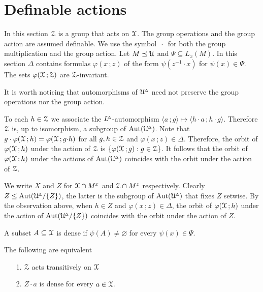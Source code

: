 \section{Definable actions}
\label{definable}

\def\ceq#1#2#3{\noindent\parbox[t]{15ex}{$\displaystyle #1$}\parbox{6ex}{\hfil $#2$}{$\displaystyle #3$}}

In this section $\EuScript Z$ is a group that acts on $\EuScript X$.
The group operations and the group action are assumed definable.
We use the symbol $\,\cdot\,$ for both the group multiplication and the group action.
Let $M\preceq\EuScript U$ and $\Psi\subseteq L_x(M)$.
In this section $\Delta$ contains formulas $\varphi(x\,;z)$ of the form $\psi(z^{-1}\!\cdot x)$ for $\psi(x)\in\Psi$.
The sets $\varphi(\EuScript X\,;\EuScript Z)$ are $\EuScript Z$-invariant.

It is worth noticing that automorphisms of $\EuScript U\kern-.2ex^{\scriptscriptstyle\Delta}$ need not preserve the group operations nor the group action.

To each $h\in\EuScript Z$ we associate the $L\kern-.4ex^{\scriptscriptstyle\Delta}$-automorphism $\langle a\,;g\rangle\mapsto\langle h{\cdot}a\,;h{\cdot}g\rangle$.
Therefore $\EuScript Z$ is, up to isomorphism, a subgroup of ${\rm Aut}(\EuScript U\kern-.2ex^{\scriptscriptstyle\Delta})$.
Note that $g\cdot\varphi(\EuScript X\,;h)=\varphi(\EuScript X\,;g{\cdot}h)$ for all $g,h\in\EuScript Z$ and $\varphi(x\,;z)\in\Delta$.
Therefore, the orbit of $\varphi(\EuScript X\,;h)$ under the action of $\EuScript Z$ is $\{\varphi(\EuScript X\,;g) : g\in\EuScript Z\}$.
It follows that the orbit of $\varphi(\EuScript X\,;h)$ under the actions of ${\rm Aut}(\EuScript U\kern-.2ex^{\scriptscriptstyle\Delta})$ coincides with the orbit under the action of $\EuScript Z$.

We write $X$ and $Z$ for $\EuScript X\cap M^x$ and $\EuScript Z\cap M^z$ respectively.
Clearly $Z\le{\rm Aut}(\EuScript U\kern-.2ex^{\scriptscriptstyle\Delta}/\{Z\})$, the latter is the subgroup of ${\rm Aut}(\EuScript U\kern-.2ex^{\scriptscriptstyle\Delta})$ that fixes $Z$ setwise.
By the observation above, when $h\in Z$ and $\varphi(x\,;z)\in\Delta$, the orbit of $\varphi(\EuScript X\,;h)$ under the action of ${\rm Aut}(\EuScript U\kern-.2ex^{\scriptscriptstyle\Delta}/\{Z\})$ coincides with the orbit under the action of $Z$.

A subset $A\subseteq\EuScript X$ is dense if $\psi(A)\neq\varnothing$ for every $\psi(x)\in\Psi$.

\begin{fact}
  The following are equivalent
  \begin{itemize}
    \item [1.] $\EuScript Z$ acts transitively on $\EuScript X$
    \item [2.] $Z{\cdot}a$ is dense for every $a\in\EuScript X$.
  \end{itemize}
\end{fact}

